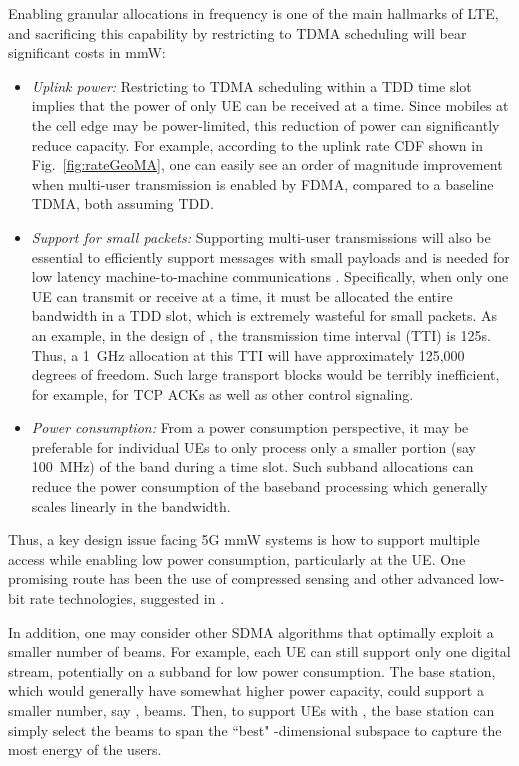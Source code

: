 \documentclass[journal]{IEEEtran}
\begin{document}
Enabling granular allocations in frequency is one of the main
hallmarks of LTE, and sacrificing this capability by restricting to TDMA scheduling
will bear significant costs in mmW:
\begin{itemize}
\item \emph{Uplink power:}
Restricting to TDMA scheduling within a TDD time slot implies that
the power of only UE can be received at a time.
Since mobiles at the cell edge may be power-limited,
this reduction of power can significantly reduce capacity.
For example,
according to the uplink rate CDF shown in Fig.~\ref{fig:rateGeoMA}, one can easily see an order of magnitude improvement when multi-user transmission is enabled by FDMA, compared to a baseline TDMA,
both assuming TDD.

\item \emph{Support for small packets:}
Supporting multi-user transmissions will also be essential
to efficiently support messages with small payloads
and is needed for low latency machine-to-machine communications \cite{fettweis2011entering}.
Specifically, when only one UE can transmit
or receive at a time, it must be allocated the entire bandwidth
in a TDD slot, which is extremely
wasteful for small packets.  As an example, in the design of \cite{KhanPi:11-CommMag},
the transmission time interval (TTI) is 125s.  Thus, a 1~GHz allocation at this TTI
will have approximately 125,000 degrees of freedom.  Such large transport blocks
would be terribly inefficient, for example, for TCP ACKs as well as other control signaling.

\item \emph{Power consumption:}
From a power consumption perspective, it may be preferable for individual UEs
to only process only a smaller portion (say 100~MHz) of the band
during a time slot.  Such subband allocations
can reduce the power consumption of the baseband processing
which generally scales linearly
in the bandwidth.
\end{itemize}

Thus, a key design issue facing 5G mmW systems is how to support multiple access while
enabling low power consumption, particularly at the UE.
One promising route has been the use of compressed sensing and other
advanced low-bit rate technologies, suggested in \cite{Madhow:ADC}.

In addition, one may consider other SDMA algorithms that optimally exploit
a smaller number of beams.  For example, each UE can still support only one digital stream,
potentially on a subband for low power consumption.  The base station, which
would generally have somewhat higher power capacity, could support a smaller
number, say , beams.  Then, to support  UEs with , the base station
can simply select the  beams to span the ``best" -dimensional subspace
to capture the most energy of the  users.
\end{document}
